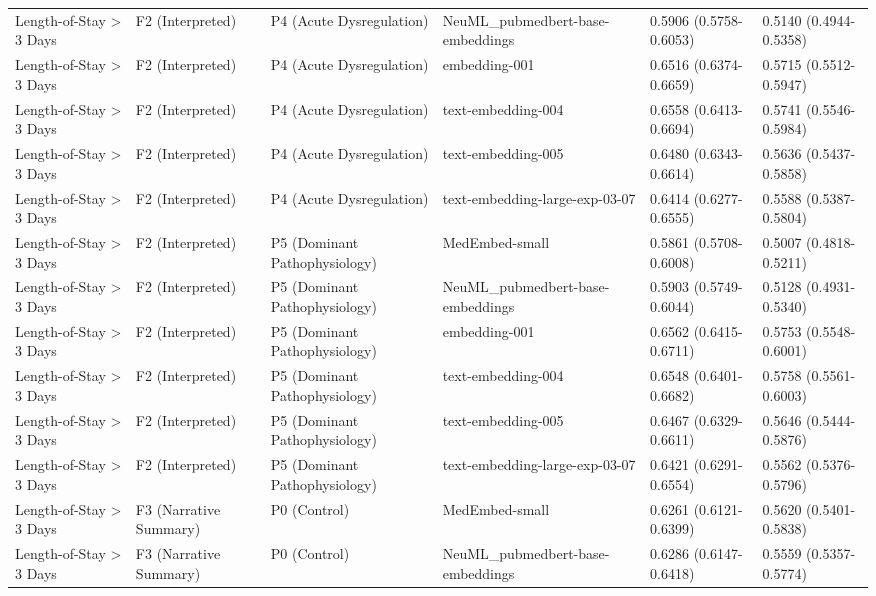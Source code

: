 \begin{tabular}{llllll}
Length-of-Stay \textgreater{} 3 Days & F2 (Interpreted) & P4 (Acute Dysregulation) & NeuML\_pubmedbert-base-embeddings & 0.5906 (0.5758-0.6053) & 0.5140 (0.4944-0.5358) \\
Length-of-Stay \textgreater{} 3 Days & F2 (Interpreted) & P4 (Acute Dysregulation) & embedding-001 & 0.6516 (0.6374-0.6659) & 0.5715 (0.5512-0.5947) \\
Length-of-Stay \textgreater{} 3 Days & F2 (Interpreted) & P4 (Acute Dysregulation) & text-embedding-004 & 0.6558 (0.6413-0.6694) & 0.5741 (0.5546-0.5984) \\
Length-of-Stay \textgreater{} 3 Days & F2 (Interpreted) & P4 (Acute Dysregulation) & text-embedding-005 & 0.6480 (0.6343-0.6614) & 0.5636 (0.5437-0.5858) \\
Length-of-Stay \textgreater{} 3 Days & F2 (Interpreted) & P4 (Acute Dysregulation) & text-embedding-large-exp-03-07 & 0.6414 (0.6277-0.6555) & 0.5588 (0.5387-0.5804) \\
Length-of-Stay \textgreater{} 3 Days & F2 (Interpreted) & P5 (Dominant Pathophysiology) & MedEmbed-small & 0.5861 (0.5708-0.6008) & 0.5007 (0.4818-0.5211) \\
Length-of-Stay \textgreater{} 3 Days & F2 (Interpreted) & P5 (Dominant Pathophysiology) & NeuML\_pubmedbert-base-embeddings & 0.5903 (0.5749-0.6044) & 0.5128 (0.4931-0.5340) \\
Length-of-Stay \textgreater{} 3 Days & F2 (Interpreted) & P5 (Dominant Pathophysiology) & embedding-001 & 0.6562 (0.6415-0.6711) & 0.5753 (0.5548-0.6001) \\
Length-of-Stay \textgreater{} 3 Days & F2 (Interpreted) & P5 (Dominant Pathophysiology) & text-embedding-004 & 0.6548 (0.6401-0.6682) & 0.5758 (0.5561-0.6003) \\
Length-of-Stay \textgreater{} 3 Days & F2 (Interpreted) & P5 (Dominant Pathophysiology) & text-embedding-005 & 0.6467 (0.6329-0.6611) & 0.5646 (0.5444-0.5876) \\
Length-of-Stay \textgreater{} 3 Days & F2 (Interpreted) & P5 (Dominant Pathophysiology) & text-embedding-large-exp-03-07 & 0.6421 (0.6291-0.6554) & 0.5562 (0.5376-0.5796) \\
Length-of-Stay \textgreater{} 3 Days & F3 (Narrative Summary) & P0 (Control) & MedEmbed-small & 0.6261 (0.6121-0.6399) & 0.5620 (0.5401-0.5838) \\
Length-of-Stay \textgreater{} 3 Days & F3 (Narrative Summary) & P0 (Control) & NeuML\_pubmedbert-base-embeddings & 0.6286 (0.6147-0.6418) & 0.5559 (0.5357-0.5774) \\

\end{tabular}
